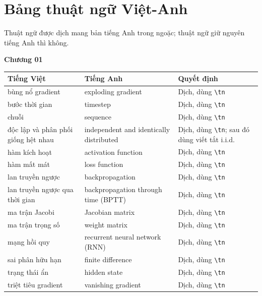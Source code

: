 \chapter{Bảng thuật ngữ Việt-Anh}
\label{app:thuat-ngu}

Thuật ngữ được dịch mang bản tiếng Anh trong ngoặc; thuật ngữ giữ nguyên
tiếng Anh thì không.

\textbf{Chương 01}

\footnotesize
\begin{tabular}{@{}llp{3.8cm}@{}}
\toprule
Tiếng Việt & Tiếng Anh & Quyết định \\
\midrule
bùng nổ gradient & exploding gradient & Dịch, dùng \texttt{\textbackslash tn} \\
bước thời gian & timestep & Dịch, dùng \texttt{\textbackslash tn} \\
chuỗi & sequence & Dịch, dùng \texttt{\textbackslash tn} \\
độc lập và phân phối giống hệt nhau & independent and identically distributed & Dịch, dùng \texttt{\textbackslash tn}; sau đó dùng viết tắt i.i.d. \\
hàm kích hoạt & activation function & Dịch, dùng \texttt{\textbackslash tn} \\
hàm mất mát & loss function & Dịch, dùng \texttt{\textbackslash tn} \\
lan truyền ngược & backpropagation & Dịch, dùng \texttt{\textbackslash tn} \\
lan truyền ngược qua thời gian & backpropagation through time (BPTT) & Dịch, dùng \texttt{\textbackslash tn} \\
ma trận Jacobi & Jacobian matrix & Dịch, dùng \texttt{\textbackslash tn} \\
ma trận trọng số & weight matrix & Dịch, dùng \texttt{\textbackslash tn} \\
mạng hồi quy & recurrent neural network (RNN) & Dịch, dùng \texttt{\textbackslash tn} \\
sai phân hữu hạn & finite difference & Dịch, dùng \texttt{\textbackslash tn} \\
trạng thái ẩn & hidden state & Dịch, dùng \texttt{\textbackslash tn} \\
triệt tiêu gradient & vanishing gradient & Dịch, dùng \texttt{\textbackslash tn} \\
\bottomrule
\end{tabular}
\normalsize


